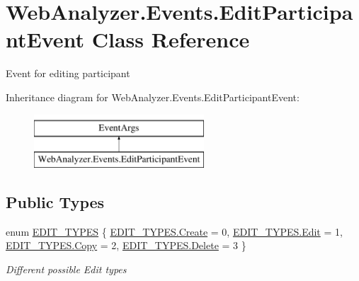 \hypertarget{class_web_analyzer_1_1_events_1_1_edit_participant_event}{}\section{Web\+Analyzer.\+Events.\+Edit\+Participant\+Event Class Reference}
\label{class_web_analyzer_1_1_events_1_1_edit_participant_event}


Event for editing participant  


Inheritance diagram for Web\+Analyzer.\+Events.\+Edit\+Participant\+Event\+:\begin{figure}[H]
\begin{center}
\leavevmode
\includegraphics[height=2.000000cm]{class_web_analyzer_1_1_events_1_1_edit_participant_event}
\end{center}
\end{figure}
\subsection*{Public Types}
\begin{DoxyCompactItemize}
\item 
enum \hyperlink{class_web_analyzer_1_1_events_1_1_edit_participant_event_a72647511d8ac40197121e93d14913a1a}{E\+D\+I\+T\+\_\+\+T\+Y\+P\+E\+S} \{ \hyperlink{class_web_analyzer_1_1_events_1_1_edit_participant_event_a72647511d8ac40197121e93d14913a1aa686e697538050e4664636337cc3b834f}{E\+D\+I\+T\+\_\+\+T\+Y\+P\+E\+S.\+Create} = 0, 
\hyperlink{class_web_analyzer_1_1_events_1_1_edit_participant_event_a72647511d8ac40197121e93d14913a1aa7dce122004969d56ae2e0245cb754d35}{E\+D\+I\+T\+\_\+\+T\+Y\+P\+E\+S.\+Edit} = 1, 
\hyperlink{class_web_analyzer_1_1_events_1_1_edit_participant_event_a72647511d8ac40197121e93d14913a1aa5fb63579fc981698f97d55bfecb213ea}{E\+D\+I\+T\+\_\+\+T\+Y\+P\+E\+S.\+Copy} = 2, 
\hyperlink{class_web_analyzer_1_1_events_1_1_edit_participant_event_a72647511d8ac40197121e93d14913a1aaf2a6c498fb90ee345d997f888fce3b18}{E\+D\+I\+T\+\_\+\+T\+Y\+P\+E\+S.\+Delete} = 3
 \}\begin{DoxyCompactList}\small\item\em Different possible Edit types \end{DoxyCompactList}
\end{DoxyCompactItemize}
